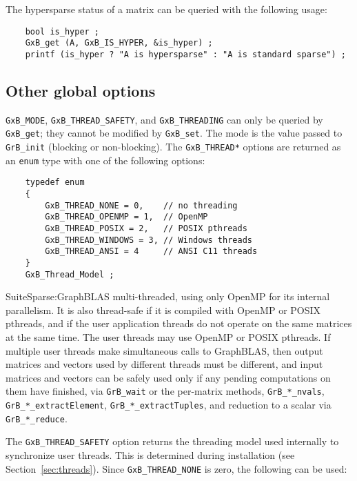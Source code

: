 \documentclass[12pt]{article}
\begin{document}
The hypersparse status of a matrix can be queried with the following usage:

{\footnotesize
\begin{verbatim}
    bool is_hyper ;
    GxB_get (A, GxB_IS_HYPER, &is_hyper) ;
    printf (is_hyper ? "A is hypersparse" : "A is standard sparse") ; \end{verbatim}}

\subsection{Other global options}

\verb'GxB_MODE', \verb'GxB_THREAD_SAFETY', and \verb'GxB_THREADING' can only be
queried by \verb'GxB_get'; they cannot be modified by \verb'GxB_set'.  The mode
is the value passed to \verb'GrB_init' (blocking or non-blocking).  The
\verb'GxB_THREAD*' options are returned as an \verb'enum' type with one of the
following options:

{\footnotesize
\begin{verbatim}
    typedef enum
    {
        GxB_THREAD_NONE = 0,    // no threading
        GxB_THREAD_OPENMP = 1,  // OpenMP
        GxB_THREAD_POSIX = 2,   // POSIX pthreads
        GxB_THREAD_WINDOWS = 3, // Windows threads
        GxB_THREAD_ANSI = 4     // ANSI C11 threads
    }
    GxB_Thread_Model ; \end{verbatim} }

SuiteSparse:GraphBLAS multi-threaded, using only OpenMP for its internal
parallelism.  It is also thread-safe if it is compiled with OpenMP or POSIX
pthreads, and if the user application threads do not operate on the same
matrices at the same time.  The user threads may use OpenMP or POSIX pthreads.
If multiple user threads make simultaneous calls to GraphBLAS, then output
matrices and vectors used by different threads must be different, and input
matrices and vectors can be safely used only if any pending computations on
them have finished, via \verb'GrB_wait' or the per-matrix methods,
\verb'GrB_*_nvals', \verb'GrB_*_extractElement', \verb'GrB_*_extractTuples',
and reduction to a scalar via \verb'GrB_*_reduce'.

The \verb'GxB_THREAD_SAFETY' option returns the threading model used internally
to synchronize user threads.  This is determined during installation (see
Section~\ref{sec:threads}).  Since \verb'GxB_THREAD_NONE' is zero, the
following can be used:
\end{document}
